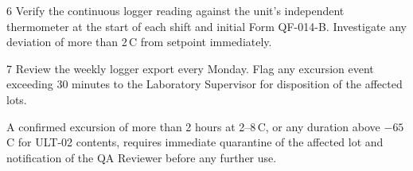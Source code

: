 \begin{procstep}{6}
Verify the continuous logger reading against the unit's independent thermometer at the
start of each shift and initial Form QF-014-B. Investigate any deviation of more than
2\,\textdegree C from setpoint immediately.
\end{procstep}

\begin{procstep}{7}
Review the weekly logger export every Monday. Flag any excursion event exceeding 30
minutes to the Laboratory Supervisor for disposition of the affected lots.
\end{procstep}

\begin{cautionbox}
A confirmed excursion of more than 2 hours at 2--8\,\textdegree C, or any duration above
$-65$\,\textdegree C for ULT-02 contents, requires immediate quarantine of the affected
lot and notification of the QA Reviewer before any further use.
\end{cautionbox}
